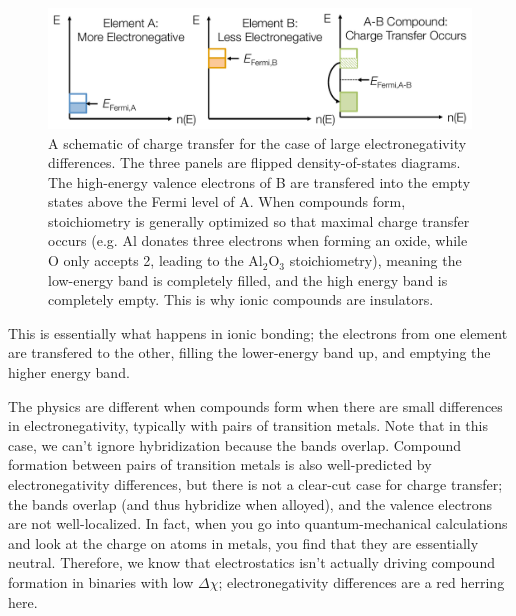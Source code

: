 \documentclass[12pt]{article}
\begin{document}
\begin{figure}[h]
\centering
\includegraphics[width=\textwidth]{chargeTransferLargeElectroneg2}
\caption{A schematic of charge transfer for the case of large electronegativity differences. The three panels are flipped density-of-states diagrams. The high-energy valence electrons of B are transfered into the empty states above the Fermi level of A. When compounds form, stoichiometry is generally optimized so that maximal charge transfer occurs (e.g. Al donates three electrons when forming an oxide, while O only accepts 2, leading to the Al$_2$O$_3$ stoichiometry), meaning the low-energy band is completely filled, and the high energy band is completely empty. This is why ionic compounds are insulators.}
\label{chargeTransfer}
\end{figure}

This is essentially what happens in ionic bonding; the electrons from one element are transfered to the other, filling the lower-energy band up, and emptying the higher energy band.

The physics are different when compounds form when there are small differences in electronegativity, typically with pairs of transition metals. Note that in this case, we can't ignore hybridization because the bands overlap. Compound formation between pairs of transition metals is also well-predicted by electronegativity differences, but there is not a clear-cut case for charge transfer; the bands overlap (and thus hybridize when alloyed), and the valence electrons are not well-localized. In fact, when you go into quantum-mechanical calculations and look at the charge on atoms in metals, you find that they are essentially neutral. Therefore, we know that electrostatics isn't actually driving compound formation in binaries with low $\Delta \chi$; electronegativity differences are a red herring here.
\end{document}
